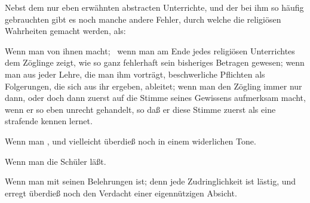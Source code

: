 Nebst dem nur eben erwähnten abstracten Unterrichte, und der bei ihm so häufig gebrauchten  gibt es noch manche andere Fehler, durch welche die religiösen Wahrheiten  gemacht werden, als:
\begin{aufza}
\item Wenn man von ihnen  macht; \zB\ wenn man am Ende jedes religiösen Unterrichtes dem Zöglinge zeigt, wie so ganz fehlerhaft sein bisheriges Betragen gewesen; wenn man aus jeder Lehre, die man ihm vorträgt, beschwerliche Pflichten als Folgerungen, die sich aus ihr ergeben, ableitet; wenn man den Zögling immer nur dann, oder doch dann zuerst auf die Stimme seines Gewissens aufmerksam macht, wenn er so eben unrecht gehandelt, so daß er diese Stimme zuerst als eine strafende kennen lernet.
\item Wenn man , und vielleicht überdieß noch in einem widerlichen Tone.
\item Wenn man die Schüler  läßt.
\item Wenn man mit seinen Belehrungen  ist; denn jede Zudringlichkeit ist lästig, und erregt überdieß noch den Verdacht einer eigennützigen Absicht.~
\end{aufza}

